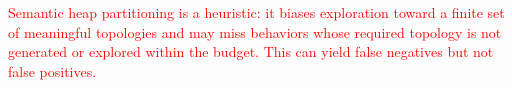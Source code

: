 \documentclass[acmsmall,screen,nonacm]{acmart}
\newcommand{\rev}[1]{\textcolor{red}{#1}}
\newcommand{\rev}[1]{#1}
\newcommand{\projName}{\textsc{Gordian}\xspace}
\theoremstyle{definition}
\begin{document}
\rev{Semantic heap partitioning is a heuristic: it biases exploration toward a finite set of meaningful topologies and may miss behaviors whose required topology is not generated or explored within the budget. This can yield false negatives but not false positives.}





\end{document}
